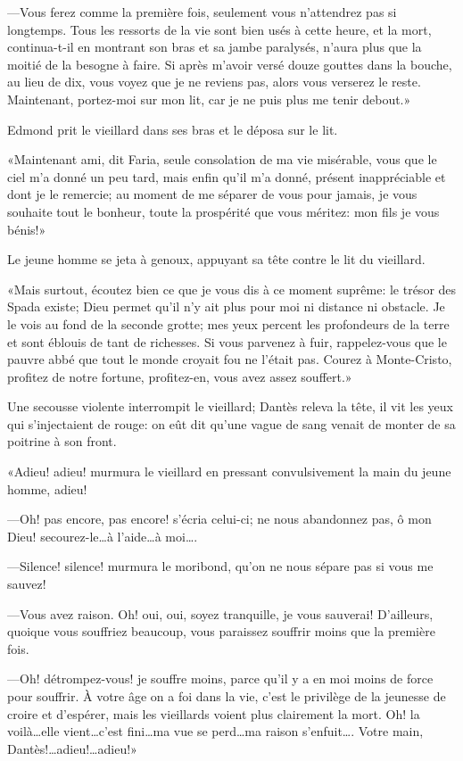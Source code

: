 —Vous ferez comme la première fois, seulement vous n'attendrez pas si longtemps. Tous les ressorts de la vie sont bien usés à cette heure, et la mort, continua-t-il en montrant son bras et sa jambe paralysés, n'aura plus que la moitié de la besogne à faire. Si après m'avoir versé douze gouttes dans la bouche, au lieu de dix, vous voyez que je ne reviens pas, alors vous verserez le reste. Maintenant, portez-moi sur mon lit, car je ne puis plus me tenir debout.»

Edmond prit le vieillard dans ses bras et le déposa sur le lit.

«Maintenant ami, dit Faria, seule consolation de ma vie misérable, vous que le ciel m'a donné un peu tard, mais enfin qu'il m'a donné, présent inappréciable et dont je le remercie; au moment de me séparer de vous pour jamais, je vous souhaite tout le bonheur, toute la prospérité que vous méritez: mon fils je vous bénis!»

Le jeune homme se jeta à genoux, appuyant sa tête contre le lit du vieillard.

«Mais surtout, écoutez bien ce que je vous dis à ce moment suprême: le trésor des Spada existe; Dieu permet qu'il n'y ait plus pour moi ni distance ni obstacle. Je le vois au fond de la seconde grotte; mes yeux percent les profondeurs de la terre et sont éblouis de tant de richesses. Si vous parvenez à fuir, rappelez-vous que le pauvre abbé que tout le monde croyait fou ne l'était pas. Courez à Monte-Cristo, profitez de notre fortune, profitez-en, vous avez assez souffert.»

Une secousse violente interrompit le vieillard; Dantès releva la tête, il vit les yeux qui s'injectaient de rouge: on eût dit qu'une vague de sang venait de monter de sa poitrine à son front.

«Adieu! adieu! murmura le vieillard en pressant convulsivement la main du jeune homme, adieu!

—Oh! pas encore, pas encore! s'écria celui-ci; ne nous abandonnez pas, ô mon Dieu! secourez-le\dots à l'aide\dots à moi\dots.

—Silence! silence! murmura le moribond, qu'on ne nous sépare pas si vous me sauvez!

—Vous avez raison. Oh! oui, oui, soyez tranquille, je vous sauverai! D'ailleurs, quoique vous souffriez beaucoup, vous paraissez souffrir moins que la première fois.

—Oh! détrompez-vous! je souffre moins, parce qu'il y a en moi moins de force pour souffrir. À votre âge on a foi dans la vie, c'est le privilège de la jeunesse de croire et d'espérer, mais les vieillards voient plus clairement la mort. Oh! la voilà\dots elle vient\dots c'est fini\dots ma vue se perd\dots ma raison s'enfuit\dots. Votre main, Dantès!\dots adieu!\dots adieu!»


